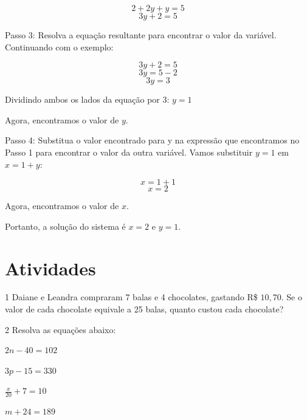 {$$2 + 2y + y = 5$$
$$3y + 2 = 5$$

Passo 3: Resolva a equação resultante para encontrar o valor da
variável. Continuando com o exemplo:

$$3y + 2 = 5$$
$$3y = 5 - 2$$
$$3y = 3$$

Dividindo ambos os lados da equação por 3: $y = 1$

Agora, encontramos o valor de $y$.

Passo 4: Substitua o valor encontrado para y na expressão que
encontramos no Passo 1 para encontrar o valor da outra variável. Vamos
substituir $y = 1$ em $x = 1 + y$:

$$x = 1 + 1$$
$$x = 2$$

Agora, encontramos o valor de $x$.

Portanto, a solução do sistema é $x = 2$ e $y = 1$.
}



\section*{Atividades}

\num{1} Daiane e Leandra compraram 7 balas e 4 chocolates, gastando R\$ $10,70$. Se
o valor de cada chocolate equivale a 25 balas, quanto custou cada
chocolate?


\num{2} Resolva as equações abaixo:

\begin{escolha}[itemsep=0pt]
  \item $2n - 40 = 102$ 
  \item $3p - 15 = 330$ 
  \item $\frac{x}{20} + 7 = 10$ 
  \item $m + 24 = 189$ 
\end{escolha}

